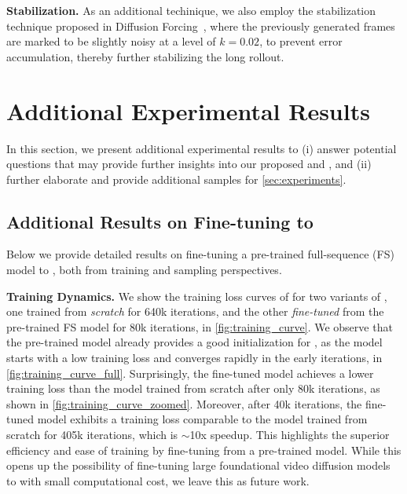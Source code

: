 \textbf{Stabilization.} As an additional techinique, we also employ the stabilization technique proposed in Diffusion Forcing~\cite{chen2024diffusion}, where the previously generated frames are marked to be slightly noisy at a level of $k=0.02$, to prevent error accumulation, thereby further stabilizing the long rollout.



\section{Additional Experimental Results}
\label{app:exp_results}

In this section, we present additional experimental results to (i) answer potential questions that may provide further insights into our proposed \mtd and \HG, and (ii) further elaborate and provide additional samples for \cref{sec:experiments}.

\subsection{Additional Results on Fine-tuning to \mtd}
\label{app:exp_finetune}



Below we provide detailed results on fine-tuning a pre-trained full-sequence (FS) model to \mtd, both from training and sampling perspectives.

\textbf{Training Dynamics.} We show the training loss curves of for two variants of \mtd, one trained from \emph{scratch} for 640k iterations, and the other \emph{fine-tuned} from the pre-trained FS model for 80k iterations, in \cref{fig:training_curve}. We observe that the pre-trained model already provides a good initialization for \mtd, as the model starts with a low training loss and converges rapidly in the early iterations, in \cref{fig:training_curve_full}. Surprisingly, the fine-tuned model achieves a lower training loss than the model trained from scratch after only 80k iterations, as shown in \cref{fig:training_curve_zoomed}. Moreover, after 40k iterations, the fine-tuned model exhibits a training loss comparable to the model trained from scratch for 405k iterations, which is $\sim$10x speedup. This highlights the superior efficiency and ease of training \mtd by fine-tuning from a pre-trained model. While this opens up the possibility of fine-tuning large foundational video diffusion models to \mtd with small computational cost, we leave this as future work.


